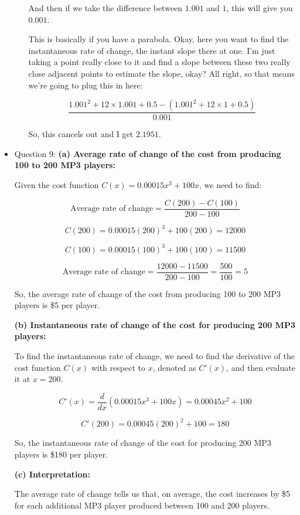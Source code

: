 \documentclass{article}
\begin{document}
\begin{itemize}
\begin{enumerate}
And then if we take the difference between \( 1.001 \) and \( 1 \), this will give you \( 0.001 \).

This is basically if you have a parabola. Okay, here you want to find the instantaneous rate of change, the instant slope there at one. I'm just taking a point really close to it and find a slope between these two really close adjacent points to estimate the slope, okay? All right, so that means we're going to plug this in here:

\[ \frac{{1.001^2 + 12 \times 1.001 + 0.5 - (1.001^2 + 12 \times 1 + 0.5)}}{{0.001}} \]

So, this cancels out and I get \( 2.1951 \).

\end{enumerate}
\item Question 9:
\textbf{(a) Average rate of change of the cost from producing 100 to 200 MP3 players:}

Given the cost function \( C(x) = 0.00015x^3 + 100x \), we need to find:

\[ \text{Average rate of change} = \frac{C(200) - C(100)}{200 - 100} \]

\[ C(200) = 0.00015(200)^3 + 100(200) = 12000 \]

\[ C(100) = 0.00015(100)^3 + 100(100) = 11500 \]

\[ \text{Average rate of change} = \frac{12000 - 11500}{200 - 100} = \frac{500}{100} = 5 \]

So, the average rate of change of the cost from producing 100 to 200 MP3 players is \$5 per player.

\textbf{(b) Instantaneous rate of change of the cost for producing 200 MP3 players:}

To find the instantaneous rate of change, we need to find the derivative of the cost function \( C(x) \) with respect to \( x \), denoted as \( C'(x) \), and then evaluate it at \( x = 200 \).

\[ C'(x) = \frac{d}{dx}(0.00015x^3 + 100x) = 0.00045x^2 + 100 \]

\[ C'(200) = 0.00045(200)^2 + 100 = 180 \]

So, the instantaneous rate of change of the cost for producing 200 MP3 players is \$180 per player.

\textbf{(c) Interpretation:}

The average rate of change tells us that, on average, the cost increases by \$5 for each additional MP3 player produced between 100 and 200 players.


\end{itemize}
\end{document}
